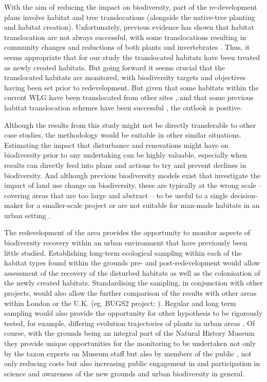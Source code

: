 With the aim of reducing the impact on biodiversity, part of the re-development plans involve habitat and tree translocations (alongside the native-tree planting and habitat creation).  Unfortunately, previous evidence has shown that habitat translocation are not always successful, with some translocations resulting in community changes and reductions of both plants and invertebrates \citep{Bullock:1998bc,jncc:2003ht}. Thus, it seems appropriate that for our study the translocated habitats have been treated as newly created habitats.  But going forward it seems crucial that the translocated habitats are monitored, with biodiversity targets and objectives having been set prior to redevelopment. But given that some habitats within the current WLG have been translocated from other sites \citep{Honey:1999ln,Leigh:2003ln}, and that some previous habitat translocation schemes have been successful \citep{dunford:2010,Twyford:2012}, the outlook is positive.

Although the results from this study might not be directly transferable to other case studies, the methodology would be suitable in other similar situations. Estimating the impact that disturbance and renovations might have on biodiversity prior to any undertaking can be highly valuable, especially when results can directly feed into plans and actions to try and prevent declines in biodiversity. And although previous biodiversity models exist that investigate the impact of land use change on biodiversity, these are typically at the wrong scale -- covering areas that are too large and abstract -- to be useful to a single decision-maker for a smaller-scale project \citep[e.g.][]{Newbold:2015nat} or are not suitable for man-made habitats in an urban setting \citep[e.g.][]{defra:2012bdo}.

The redevelopment of the area provides the opportunity to monitor aspects of biodiversity recovery within an urban environment that have previously been little studied. Establishing long-term ecological sampling within each of the habitat types found within the grounds pre- and post-redevelopment would allow assessment of the recovery of the disturbed habitats as well as the colonisation of the newly created habitats.  Standardising the sampling, in conjunction with other projects, would also allow the further comparison of the results with other areas within London \citep[eg.][]{Smith:2006ue} or the U.K. (eg. BUGS2 project: \citealt{Loram:2007le}).  Regular and long term sampling would also provide the opportunity for other hypothesis to be rigorously tested, for example, differing evolution trajectories of plants in urban areas \citep{Johnson:2015ajb}.  Of course, with the grounds being an integral part of the Natural History Museum they provide unique opportunities for the monitoring to be undertaken not only by the taxon experts on Museum staff but also by members of the public \citep{Silvertown:2009tree,Roy:2012citsci}, not only reducing costs but also increasing public engagement in and participation in science and awareness of the new grounds and urban biodiversity in general. 

